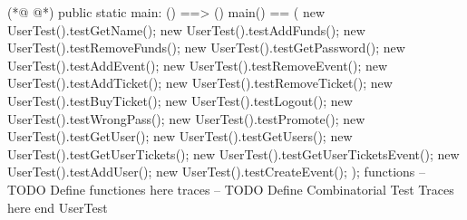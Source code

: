 \begin{vdmpp}[breaklines=true]
(*@
\label{main:152}
@*)
 public static main: () ==> ()
 main() == (
  new UserTest().testGetName();
  new UserTest().testAddFunds();
  new UserTest().testRemoveFunds();
  new UserTest().testGetPassword();
  new UserTest().testAddEvent();
  new UserTest().testRemoveEvent();
  new UserTest().testAddTicket();
  new UserTest().testRemoveTicket();
  new UserTest().testBuyTicket();
  new UserTest().testLogout();
  new UserTest().testWrongPass();
  new UserTest().testPromote();
  new UserTest().testGetUser();
  new UserTest().testGetUsers();
  new UserTest().testGetUserTickets();
  new UserTest().testGetUserTicketsEvent();
  new UserTest().testAddUser();
  new UserTest().testCreateEvent();
 );
functions
-- TODO Define functiones here
traces
-- TODO Define Combinatorial Test Traces here
end UserTest
\end{vdmpp}
